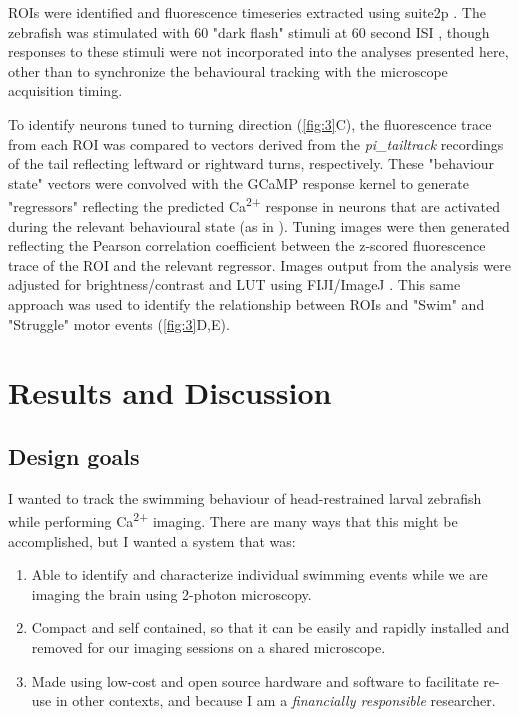 \documentclass[9pt,lineno]{RandlettLab_elife}
\begin{document}
ROIs were identified and fluorescence timeseries extracted using suite2p \citep{Pachitariu2016-tl}. The zebrafish was stimulated with 60 "dark flash" stimuli at 60 second ISI \citep{Lamire2023-di}, though responses to these stimuli were not incorporated into the analyses presented here, other than to synchronize the behavioural tracking with the microscope acquisition timing.


To identify neurons tuned to turning direction (\autoref{fig:3}C), the fluorescence trace from each ROI was compared to vectors derived from the \emph{pi\_tailtrack} recordings of the tail reflecting leftward or rightward turns, respectively. These "behaviour state" vectors were convolved with the GCaMP response kernel to generate "regressors" reflecting the predicted Ca\textsuperscript{2+} response in neurons that are activated during the relevant behavioural state (as in \cite{Miri2011-sr}). Tuning images were then generated reflecting the Pearson correlation coefficient between the z-scored fluorescence trace of the ROI and the relevant regressor. Images output from the analysis were adjusted for brightness/contrast and LUT using FIJI/ImageJ \citep{Schindelin2012-hd}. This same approach was used to identify the relationship between ROIs and "Swim" and "Struggle" motor events (\autoref{fig:3}D,E). 

\section{Results and Discussion}

\subsection{Design goals}

I wanted to track the swimming behaviour of head-restrained larval zebrafish while performing Ca\textsuperscript{2+} imaging. There are many ways that this might be accomplished, but I wanted a system that was: 
\begin{enumerate}
    \item Able to identify and characterize individual swimming events while we are imaging the brain using 2-photon microscopy.
    \item Compact and self contained, so that it can be easily and rapidly installed and removed for our imaging sessions on a shared microscope.
    \item Made using low-cost and open source hardware and software to facilitate re-use in other contexts, and because I am a  \emph{financially responsible} researcher.

\end{enumerate}
\end{document}
